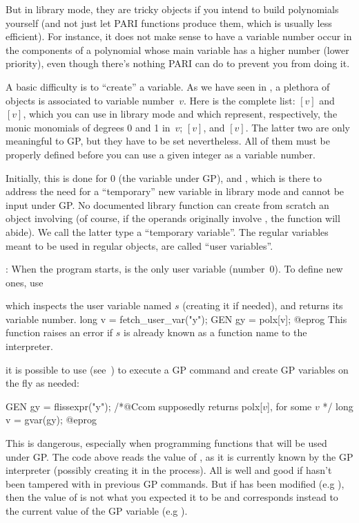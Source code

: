 But in library mode, they are tricky objects if you intend to build
polynomials yourself (and not just let PARI functions produce them, which is
usually less efficient). For instance, it does not make sense to have a
variable number occur in the components of a polynomial whose main variable
has a higher number (lower priority), even though there's nothing PARI can do
to prevent you from doing it.

A basic difficulty is to ``create'' a variable. As we have seen in
, a plethora of objects is associated to variable
number~$v$. Here is the complete list: $[v]$ and
$[v]$, which you can use in library mode and which represent,
respectively, the monic monomials of degrees 0 and 1 in~$v$;
$[v]$, and $[v]$. The latter two are only
meaningful to GP, but they have to be set nevertheless. All of them must be
properly defined before you can use a given integer as a variable number.

Initially, this is done for $0$ (the variable  under GP), and
, which is there to address the need for a ``temporary'' new
variable in library mode and cannot be input under GP.
No documented library function can create from scratch an object involving
 (of course, if the operands originally involve ,
the function will abide). We call the latter type a ``temporary variable''.
The regular variables meant to be used in regular objects, are called ``user
variables''.

:
When the program starts,  is the only user variable (number~$0$). To
define new ones, use


\noindent which inspects the user variable named $s$ (creating it if
needed), and returns its variable number. 
\bprog
long v = fetch_user_var("y");
GEN gy = polx[v];
@eprog
This function raises an error if $s$ is already known as a function name to
the interpreter.

 it is possible to use 
(see~) to execute a GP command and create GP variables
on the fly as needed:

\bprog
GEN gy = flissexpr("y"); /*@Ccom supposedly returns polx[$v$], for some $v$ */
long v = gvar(gy);
@eprog

\noindent This is dangerous, especially when programming functions that
will be used under GP. The code above reads the value of , as it is
currently known by the GP interpreter (possibly creating it in the
process). All is well and good if  hasn't been tampered with in
previous GP commands. But if  has been modified (e.g ),
then the value of  is not what you expected it to be and corresponds
instead to the current value of the GP variable (e.g ).


